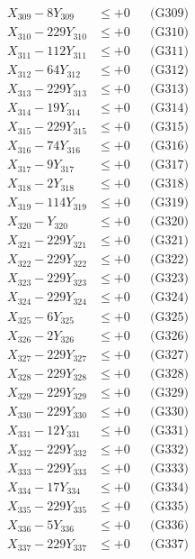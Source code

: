 \documentclass[a4paper,10pt]{article}
\begin{document}
{\begin{align}
X_{309} - 8Y_{309} &\leq +0 && \text{(G309)} \\
X_{310} - 229Y_{310} &\leq +0 && \text{(G310)} \\
\allowbreak
X_{311} - 112Y_{311} &\leq +0 && \text{(G311)} \\
X_{312} - 64Y_{312} &\leq +0 && \text{(G312)} \\
X_{313} - 229Y_{313} &\leq +0 && \text{(G313)} \\
X_{314} - 19Y_{314} &\leq +0 && \text{(G314)} \\
X_{315} - 229Y_{315} &\leq +0 && \text{(G315)} \\
X_{316} - 74Y_{316} &\leq +0 && \text{(G316)} \\
X_{317} - 9Y_{317} &\leq +0 && \text{(G317)} \\
X_{318} - 2Y_{318} &\leq +0 && \text{(G318)} \\
X_{319} - 114Y_{319} &\leq +0 && \text{(G319)} \\
X_{320} - Y_{320} &\leq +0 && \text{(G320)} \\
\allowbreak
X_{321} - 229Y_{321} &\leq +0 && \text{(G321)} \\
X_{322} - 229Y_{322} &\leq +0 && \text{(G322)} \\
X_{323} - 229Y_{323} &\leq +0 && \text{(G323)} \\
X_{324} - 229Y_{324} &\leq +0 && \text{(G324)} \\
X_{325} - 6Y_{325} &\leq +0 && \text{(G325)} \\
X_{326} - 2Y_{326} &\leq +0 && \text{(G326)} \\
X_{327} - 229Y_{327} &\leq +0 && \text{(G327)} \\
X_{328} - 229Y_{328} &\leq +0 && \text{(G328)} \\
X_{329} - 229Y_{329} &\leq +0 && \text{(G329)} \\
X_{330} - 229Y_{330} &\leq +0 && \text{(G330)} \\
\allowbreak
X_{331} - 12Y_{331} &\leq +0 && \text{(G331)} \\
X_{332} - 229Y_{332} &\leq +0 && \text{(G332)} \\
X_{333} - 229Y_{333} &\leq +0 && \text{(G333)} \\
X_{334} - 17Y_{334} &\leq +0 && \text{(G334)} \\
X_{335} - 229Y_{335} &\leq +0 && \text{(G335)} \\
X_{336} - 5Y_{336} &\leq +0 && \text{(G336)} \\
X_{337} - 229Y_{337} &\leq +0 && \text{(G337)} \\

\end{align}}
\end{document}
